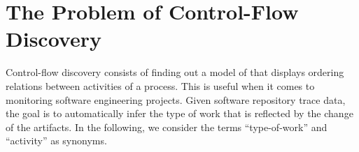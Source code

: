 

\section{The Problem of Control-Flow Discovery}
\label{sec:problem}

Control-flow discovery consists of finding out a model of that displays ordering relations between activities of a process. This is useful when it comes to monitoring software engineering projects. Given software repository trace data, the goal is to automatically infer the type of work that is reflected by the change of the artifacts. 
In the following, we consider the terms ``type-of-work'' and ``activity'' as synonyms.


